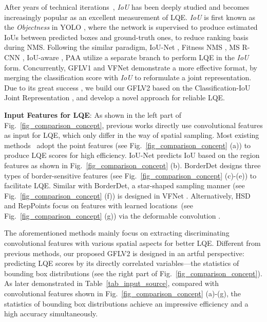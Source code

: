 \documentclass[10pt,twocolumn,letterpaper]{article}
\begin{document}
After years of 
technical iterations~\cite{redmon2016you,redmon2017yolo9000,redmon2018yolov3,jiang2018acquisition,tychsen2018improving,huang2019mask,wu2020iou,kim2020probabilistic,li2020generalized,zhang2020varifocalnet}, \emph{IoU} has been deeply studied and becomes increasingly popular as an excellent measurement of LQE.
\emph{IoU} is first known as the \emph{Objectness} in YOLO \cite{redmon2016you,redmon2017yolo9000,redmon2018yolov3}, where the network is supervised to produce estimated IoUs between predicted boxes and ground-truth ones, to 
reduce ranking basis during NMS. 
Following the similar paradigm, IoU-Net \cite{jiang2018acquisition}, Fitness NMS \cite{tychsen2018improving}, MS R-CNN \cite{huang2019mask}, IoU-aware \cite{wu2020iou}, PAA \cite{kim2020probabilistic} utilize a separate branch to perform LQE in the \emph{IoU} form.
Concurrently, GFLV1 \cite{li2020generalized} and VFNet \cite{zhang2020varifocalnet} demonstrate a more effective format, by merging the classification score with \emph{IoU} to reformulate a joint representation.
Due to its great success \cite{li2020generalized,zhang2020varifocalnet}, we build our GFLV2 based on 
the Classification-IoU Joint Representation \cite{li2020generalized},
and develop a novel approach for reliable LQE.

\noindent\textbf{Input Features for LQE}: As shown in the left part of Fig.~\ref{fig_comparison_concept}, previous works directly use 
convolutional features as input for 
LQE, which only differ in the way of spatial sampling.
Most existing methods~\cite{redmon2016you,redmon2017yolo9000,redmon2018yolov3,tian2019fcos,zhang2019bridging,wu2020iou,kim2020probabilistic,li2020generalized} adopt the point features (see Fig.~\ref{fig_comparison_concept} (a)) to produce LQE scores for high efficiency. 
IoU-Net \cite{jiang2018acquisition} predicts IoU based on the region features as shown in Fig.~\ref{fig_comparison_concept} (b).
BorderDet \cite{qiu2020borderdet} designs three types of border-sensitive features (see Fig.~\ref{fig_comparison_concept} (c)-(e)) to facilitate LQE.
Similar with BorderDet, 
a star-shaped sampling manner (see Fig.~\ref{fig_comparison_concept} (f))
is designed in VFNet \cite{zhang2020varifocalnet}.
Alternatively, HSD \cite{cao2019hierarchical} and RepPoints \cite{yang2019reppoints,chen2020reppoints} focus on features with learned locations~(see Fig.~\ref{fig_comparison_concept} (g)) via the deformable convolution \cite{dai2017deformable,zhu2019deformable}.

The aforementioned methods mainly focus on extracting discriminating convolutional features with various spatial aspects for better LQE.
Different from previous methods, our proposed GFLV2 is designed in an
artful perspective: 
predicting LQE scores by its directly correlated variables---the statistics of bounding box distributions (see the right part of Fig.~\ref{fig_comparison_concept}).
As later demonstrated in 
Table~\ref{tab_input_source},
compared with convolutional features shown in Fig.~\ref{fig_comparison_concept} (a)-(g),
the statistics of bounding box distributions achieve an impressive efficiency and a high accuracy simultaneously.
\end{document}
